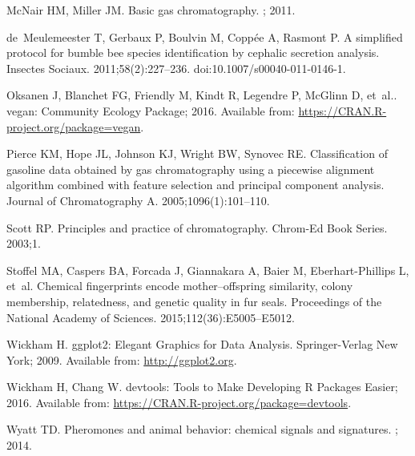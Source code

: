 \documentclass[10pt,letterpaper]{article}
\begin{document}
\begin{thebibliography}{10}
McNair HM, Miller JM.
\newblock Basic gas chromatography.
; 2011.

de~Meulemeester T, Gerbaux P, Boulvin M, Copp{\'e}e A, Rasmont P.
\newblock A simplified protocol for bumble bee species identification by
  cephalic secretion analysis.
\newblock Insectes Sociaux. 2011;58(2):227--236.
\newblock doi:{10.1007/s00040-011-0146-1}.

Oksanen J, Blanchet FG, Friendly M, Kindt R, Legendre P, McGlinn D, et~al..
  vegan: Community Ecology Package; 2016.
\newblock Available from: \url{https://CRAN.R-project.org/package=vegan}.

Pierce KM, Hope JL, Johnson KJ, Wright BW, Synovec RE.
\newblock Classification of gasoline data obtained by gas chromatography using
  a piecewise alignment algorithm combined with feature selection and principal
  component analysis.
\newblock Journal of Chromatography A. 2005;1096(1):101--110.

Scott RP.
\newblock Principles and practice of chromatography.
\newblock Chrom-Ed Book Series. 2003;1.

Stoffel MA, Caspers BA, Forcada J, Giannakara A, Baier M, Eberhart-Phillips L,
  et~al.
\newblock Chemical fingerprints encode mother--offspring similarity, colony
  membership, relatedness, and genetic quality in fur seals.
\newblock Proceedings of the National Academy of Sciences.
  2015;112(36):E5005--E5012.

Wickham H.
\newblock ggplot2: Elegant Graphics for Data Analysis.
\newblock Springer-Verlag New York; 2009.
\newblock Available from: \url{http://ggplot2.org}.


Wickham H, Chang W. devtools: Tools to Make Developing R Packages Easier; 2016.
\newblock Available from: \url{https://CRAN.R-project.org/package=devtools}.

Wyatt TD.
\newblock Pheromones and animal behavior: chemical signals and signatures.
; 2014.

\end{thebibliography}
\end{document}
